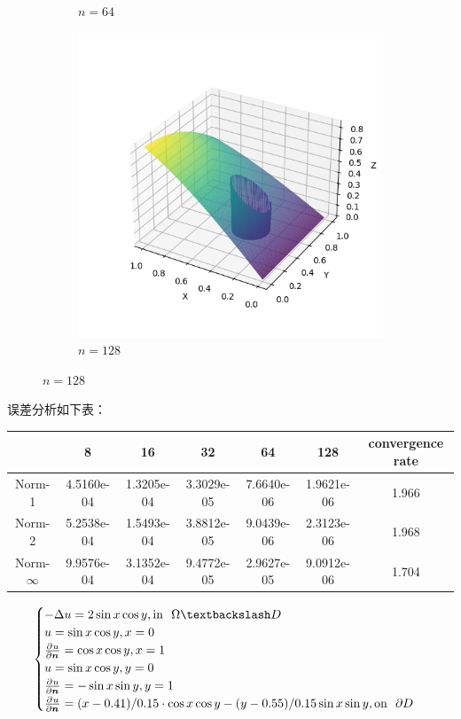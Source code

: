 \documentclass[lang=cn,a4paper,newtx,bibend=bibtex]{elegantpaper}
\begin{document}
\begin{figure}[H]
\begin{subfigure}[b]{0.18\textwidth}
      \caption{$n = 64$}
  \end{subfigure}
  \hfill
  \begin{subfigure}[b]{0.18\textwidth}
      \includegraphics[width=\textwidth]{../../res_bac/res-[data|2-Neumann-irregular-e128].png}
      \caption{$n = 128$}
  \end{subfigure}
\end{figure}

误差分析如下表：

\begin{table}[H]
  \centering
  \begin{tabular}{|c|c|c|c|c|c|c|}
  \hline
   & 8 & 16 & 32 & 64 & 128 & convergence rate \\
  \hline
  Norm-1 & 4.5160e-04 & 1.3205e-04 & 3.3029e-05 & 7.6640e-06 & 1.9621e-06 & 1.966  \\
  Norm-2 & 5.2538e-04 & 1.5493e-04 & 3.8812e-05 & 9.0439e-06 & 2.3123e-06 & 1.968 \\
  Norm-$\infty$ & 9.9576e-04 & 3.1352e-04 & 9.4772e-05 & 2.9627e-05 & 9.0912e-06 & 1.704 \\
  \hline
  \end{tabular}
  \end{table}


\[
\begin{cases}
  - \Delta u = 2\sin x \cos y, \text{in~~} \Omega \fxg D \\
  u = \sin x \cos y, x = 0 \\
  \apart{u}{\bm{n}}{} = \cos x \cos y, x = 1 \\  
  u = \sin x \cos y, y = 0 \\
  \apart{u}{\bm{n}}{} = - \sin x \sin y, y = 1 \\  
  \apart{u}{\bm{n}}{} = (x - 0.41)/0.15\cdot \cos x \cos y - ( y - 0.55) / 0.15 \sin x \sin y, \text{on~~} \partial D
\end{cases}
\]
\end{document}
